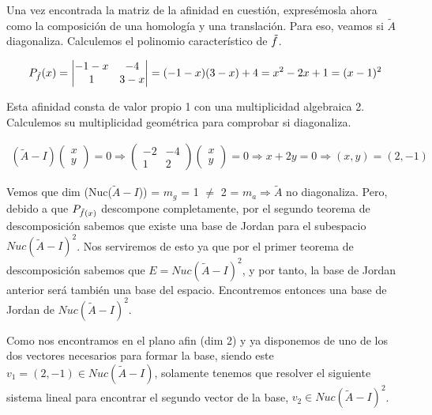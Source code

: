 Una vez encontrada la matriz de la afinidad en cuestión, expresémosla ahora como la composición de una homología y una translación. Para eso, veamos si $\widetilde{A}$ diagonaliza. Calculemos el polinomio característico de $\Tilde{f}$.

\begin{gather*}
    P_{\Tilde{f}}(x) = 
    \begin{vmatrix}
    -1 - x & -4\\
    1 & 3 - x
    \end{vmatrix}
    = (-1-x)(3-x) + 4 = x^{2} -2x + 1 = (x - 1)^{2}
\end{gather*}

Esta afinidad consta de valor propio 1 con una multiplicidad algebraica 2. Calculemos su multiplicidad geométrica para comprobar si diagonaliza.

\begin{gather*}
    (\widetilde{A}- I)
    \begin{pmatrix}
    x\\ y
    \end{pmatrix}
    = 0 \Longrightarrow
    \begin{pmatrix}
    -2 & -4\\
    1 & 2
    \end{pmatrix}
    \begin{pmatrix}
    x\\ y
    \end{pmatrix}
    = 0 \Longrightarrow x + 2y = 0 \Longrightarrow (x, y) = (2, -1)
\end{gather*}

\pagebreak

Vemos que dim (Nuc($\widetilde{A} - I$)) = $m_g$ = 1 $\neq$ 2 = $m_a \Longrightarrow \widetilde{A}$ no diagonaliza. Pero, debido a que $P_{\Tilde{f}(x)}$ descompone completamente, por el segundo teorema de descomposición sabemos que existe una base de Jordan para el subespacio $Nuc(\widetilde{A} - I)^{2}$. Nos serviremos de esto ya que por el primer teorema de descomposición sabemos que $E = Nuc(\widetilde{A} - I)^{2}$, y por tanto, la base de Jordan anterior será también una base del espacio. Encontremos entonces una base de Jordan de $Nuc(\widetilde{A} - I)^{2}$.

Como nos encontramos en el plano afin (dim 2) y ya disponemos de uno de los dos vectores necesarios para formar la base, siendo este $v_1 = (2, -1) \in Nuc(\widetilde{A} - I)$, solamente tenemos que resolver el siguiente sistema lineal para encontrar el segundo vector de la base, $v_2 \in Nuc(\widetilde{A} - I)^{2}$.

